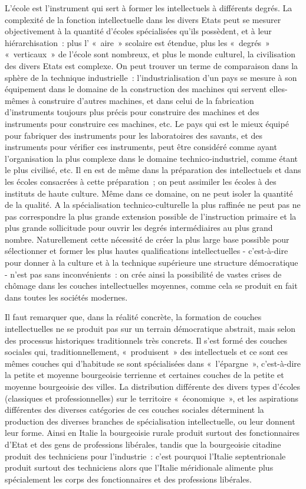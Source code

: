 \documentclass[french,twoside]{book} %
\begin{document}
L'école est l’instrument qui sert à former les intellectuels à différents degrés. La complexité de la fonction intellectuelle dans les divers Etats peut se mesurer objectivement à la quantité d’écoles spécialisées qu’ils possèdent, et à leur hiérarchisation : plus l’ « aire » scolaire est étendue, plus les « degrés » « verticaux » de l’école sont nombreux, et plus le monde culturel, la civilisation des divers Etats est complexe. On peut trouver un terme de comparaison dans la sphère de la technique industrielle : l’industrialisation d’un pays se mesure à son équipement dans le domaine de la construction des machines qui servent elles-mêmes à construire d’autres machines, et dans celui de la fabrication d’instruments toujours plus précis pour construire des machines et des instruments pour construire ces machines, etc. Le pays qui est le mieux équipé pour fabriquer des instruments pour les laboratoires des savants, et des instruments pour vérifier ces instruments, peut être considéré comme ayant l’organisation la plus complexe dans le domaine technico-industriel, comme étant le plus civilisé, etc. Il en est de même dans la préparation des intellectuels et dans les écoles consacrées à cette préparation ; on peut assimiler les écoles à des instituts de haute culture. Même dans ce domaine, on ne peut isoler la quantité de la qualité. A la spécialisation technico-culturelle la plus raffinée ne peut pas ne pas correspondre la plus grande extension possible de l’instruction primaire et la plus grande sollicitude pour ouvrir les degrés intermédiaires au plus grand nombre. Naturellement cette nécessité de créer la plus large base possible pour sélectionner et former les plus hautes qualifications intellectuelles - c’est-à-dire pour donner à la culture et à la technique supérieure une structure démocratique - n’est pas sans inconvénients : on crée ainsi la possibilité de vastes crises de chômage dans les couches intellectuelles moyennes, comme cela se produit en fait dans toutes les sociétés modernes.\par
Il faut remarquer que, dans la réalité concrète, la formation de couches intellectuelles ne se produit pas sur un terrain démocratique abstrait, mais selon des processus historiques traditionnels très concrets. Il s’est formé des couches sociales qui, traditionnellement, « produisent » des intellectuels et ce sont ces mêmes couches qui d’habitude se sont spécialisées dans « l’épargne », c’est-à-dire la petite et moyenne bourgeoisie terrienne et certaines couches de la petite et moyenne bourgeoisie des villes. La distribution différente des divers types d’écoles (classiques et professionnelles) sur le territoire « économique », et les aspirations différentes des diverses catégories de ces couches sociales déterminent la production des diverses branches de spécialisation intellectuelle, ou leur donnent leur forme. Ainsi en Italie la bourgeoisie rurale produit surtout des fonctionnaires d’Etat et des gens de professions libérales, tandis que la bourgeoisie citadine produit des techniciens pour l’industrie : c’est pourquoi l’Italie septentrionale produit surtout des techniciens alors que l’Italie méridionale alimente plus spécialement les corps des fonctionnaires et des professions libérales.\par
\end{document}
